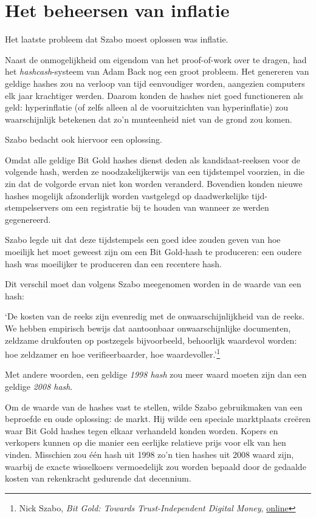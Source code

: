 \documentclass[
  a5paper,
  smalldemyvopaper,11pt,twoside,onecolumn,openright,extrafontsizes,
hidelinks]{memoir}
\renewenvironment{quote}%
               {\list{}{\rightmargin=.3cm\leftmargin=.3cm}%
                \itshape \item[]}%
               {\endlist}
\begin{document}
\section{Het beheersen van inflatie}\label{het-beheersen-van-inflatie}

Het laatste probleem dat Szabo moest oplossen was inflatie.

Naast de onmogelijkheid om eigendom van het proof-of-work over te
dragen, had het \emph{hashcash}-systeem van Adam Back nog een groot
probleem. Het genereren van geldige hashes zou na verloop van tijd
eenvoudiger worden, aangezien computers elk jaar krachtiger werden.
Daarom konden de hashes niet goed functioneren als geld: hyperinflatie
(of zelfs alleen al de vooruitzichten van hyperinflatie) zou
waarschijnlijk betekenen dat zo'n munteenheid niet van de grond zou
komen.

Szabo bedacht ook hiervoor een oplossing.

Omdat alle geldige Bit Gold hashes dienst deden als kandidaat-reeksen
voor de volgende hash, werden ze noodzakelijkerwijs van een tijdstempel
voorzien, in die zin dat de volgorde ervan niet kon worden veranderd.
Bovendien konden nieuwe hashes mogelijk afzonderlijk worden vastgelegd
op daadwerkelijke tijd-stempelservers om een registratie bij te houden
van wanneer ze werden gegenereerd.

Szabo legde uit dat deze tijdstempels een goed idee zouden geven van hoe
moeilijk het moet geweest zijn om een Bit Gold-hash te produceren: een
oudere hash was moeilijker te produceren dan een recentere hash.

Dit verschil moet dan volgens Szabo meegenomen worden in de waarde van
een hash:

\begin{quote}
`De kosten van de reeks zijn evenredig met de onwaarschijnlijkheid van
de reeks. We hebben empirisch bewijs dat aantoonbaar onwaarschijnlijke
documenten, zeldzame drukfouten op postzegels bijvoorbeeld, behoorlijk
waardevol worden: hoe zeldzamer en hoe verifieerbaarder, hoe
waardevoller.'\footnote{Nick Szabo, \emph{Bit Gold: Towards
  Trust-Independent Digital Money},
  \href{https://web.archive.org/web/20140406003811/http://szabo.best.vwh.net/bitgold.html}{online}}
\end{quote}

Met andere woorden, een geldige \emph{1998 hash} zou meer waard moeten
zijn dan een geldige \emph{2008 hash}.

Om de waarde van de hashes vast te stellen, wilde Szabo gebruikmaken van
een beproefde en oude oplossing: de markt. Hij wilde een speciale
marktplaats creëren waar Bit Gold hashes tegen elkaar verhandeld konden
worden. Kopers en verkopers kunnen op die manier een eerlijke relatieve
prijs voor elk van hen vinden. Misschien zou één hash uit 1998 zo'n tien
hashes uit 2008 waard zijn, waarbij de exacte wisselkoers vermoedelijk
zou worden bepaald door de gedaalde kosten van rekenkracht gedurende dat
decennium.
\end{document}
